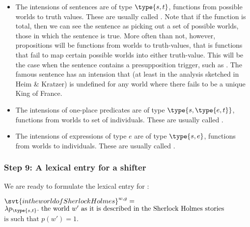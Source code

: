 \enlargethispage{24pt}
\begin{itemize}
\item The intensions of sentences are of type $\type{s,t}$, functions from
  possible worlds to truth values. These are usually called .
  Note that if the function is total, then we can see the sentence as picking
  out a set of possible worlds, those in which the sentence is true. More often
  than not, however, propositions will be  functions from worlds
  to truth-values, that is functions that fail to map certain possible worlds
  into either truth-value. This will be the case when the sentence contains a
  presupposition trigger, such as . %
  The famous sentence  has an intension
  that (at least in the analysis sketched in Heim \& Kratzer) is undefined for
  any world where there fails to be a unique King of France.
\item The intensions of one-place predicates are of type
  $\type{s,\type{e,t}}$, functions from worlds to set of individuals. These
  are usually called .
\item The intensions of expressions of type $e$ are of type $\type{s,e}$,
  functions from worlds to individuals. These are usually called
  .
\end{itemize}


\subsubsection{Step 9: A lexical entry for a shifter}
\label{sec:lexic-entry-expr}

We are ready to formulate the lexical entry for :

\ex $\svt{in the world of Sherlock Holmes}^{w,g} =$\\
$\lambda p_{\type{s,t}}.\ \mbox{the world } w'
\mbox{ as it is described in the Sherlock Holmes stories}$\\
$\mbox{is such that } p(w') = 1$. \xe

